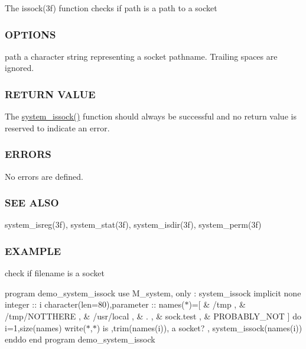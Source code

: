 The issock(3f) function checks if path is a path to a socket

\subsubsection*{O\+P\+T\+I\+O\+NS}

path a character string representing a socket pathname. Trailing spaces are ignored.

\subsubsection*{R\+E\+T\+U\+RN V\+A\+L\+UE}

The \mbox{\hyperlink{namespacem__system_af6eb5074fe74552bc7a5e7d00f459087}{system\+\_\+issock()}} function should always be successful and no return value is reserved to indicate an error.

\subsubsection*{E\+R\+R\+O\+RS}

No errors are defined.

\subsubsection*{S\+EE A\+L\+SO}

system\+\_\+isreg(3f), system\+\_\+stat(3f), system\+\_\+isdir(3f), system\+\_\+perm(3f)

\subsubsection*{E\+X\+A\+M\+P\+LE}

check if filename is a socket

program demo\+\_\+system\+\_\+issock use M\+\_\+system, only \+: system\+\_\+issock implicit none integer \+:\+: i character(len=80),parameter \+:\+: names($\ast$)=\mbox{[} \& \textquotesingle{}/tmp \textquotesingle{}, \& \textquotesingle{}/tmp/\+N\+O\+T\+T\+H\+E\+RE \textquotesingle{}, \& \textquotesingle{}/usr/local \textquotesingle{}, \& \textquotesingle{}. \textquotesingle{}, \& \textquotesingle{}sock.\+test \textquotesingle{}, \& \textquotesingle{}P\+R\+O\+B\+A\+B\+L\+Y\+\_\+\+N\+OT \textquotesingle{}\mbox{]} do i=1,size(names) write($\ast$,$\ast$)\textquotesingle{} is \textquotesingle{},trim(names(i)),\textquotesingle{} a socket? \textquotesingle{}, system\+\_\+issock(names(i)) enddo end program demo\+\_\+system\+\_\+issock 


